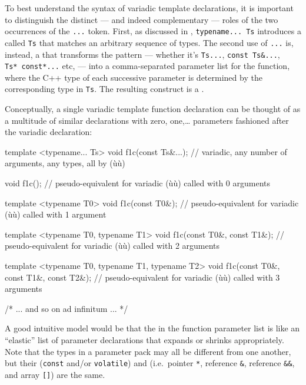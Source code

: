 \noindent To best understand the syntax of variadic template declarations, it is
important to distinguish the distinct --- and indeed complementary ---
roles of the two occurrences of the \lstinline!...! token. First, as
discussed in ,
\lstinline!typename...!~\lstinline!Ts! introduces a  called \lstinline!Ts! that matches an arbitrary sequence of types.
The second use of \lstinline!...! is, instead, a 
that transforms the pattern --- whether it's \lstinline!Ts...!,
\lstinline!const!~\lstinline!Ts&...!, \lstinline!Ts*!~\lstinline!const*...! etc,
--- into a comma-separated parameter list for the function, where the
C++ type of each successive parameter is determined by the corresponding
type in \lstinline!Ts!. The resulting construct is a .

Conceptually, a single variadic template function declaration can be
thought of as a multitude of similar declarations with zero,
one,\ldots{} parameters fashioned after the variadic declaration:

\begin{emcppslisting}
template <typename... Ts> void f1c(const Ts&...);
    // variadic, any number of arguments, any types, all by (ù{}ù)

void f1c();
    // pseudo-equivalent for variadic (ù{}ù) called with 0 arguments

template <typename T0> void f1c(const T0&);
    // pseudo-equivalent for variadic (ù{}ù) called with 1 argument

template <typename T0, typename T1>
void f1c(const T0&, const T1&);
    // pseudo-equivalent for variadic (ù{}ù) called with 2 arguments

template <typename T0, typename T1, typename T2>
void f1c(const T0&, const T1&, const T2&);
    // pseudo-equivalent for variadic (ù{}ù) called with 3 arguments

/* ... and so on ad infinitum ... */
\end{emcppslisting}
    

\noindent A good intuitive model would be that the  in the
function parameter list is like an ``elastic'' list of parameter
declarations that expands or shrinks appropriately. Note that the types
in a parameter pack may all be different from one another, but their
 (\lstinline!const! and/or \lstinline!volatile!) and
 (i.e.~pointer \lstinline!*!, reference
\lstinline!&!,  reference \lstinline!&&!, and array \lstinline![]!) are
the same.

